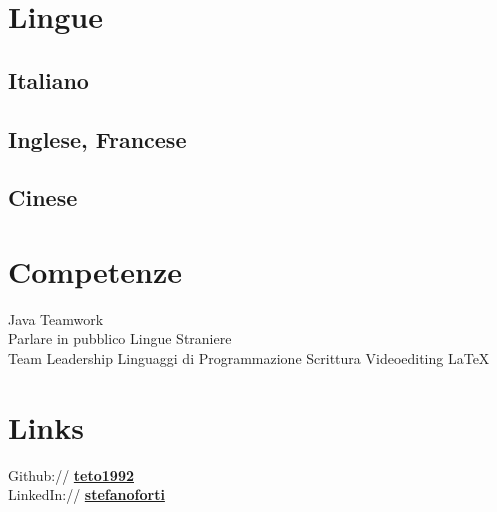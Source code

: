 \documentclass[a4paper]{deedy-resume} %
\begin{document}
\begin{minipage}[t]{0.33\textwidth}

\sectionspace %


\section{Lingue}

\subsection{Italiano}

\subsection{Inglese, Francese}


\subsection{Cinese}

\sectionspace %


\section{Competenze}

Java \textbullet{} Teamwork \textbullet{} \\Parlare in pubblico \textbullet{} Lingue Straniere\textbullet{}\\
Team Leadership\textbullet{} Linguaggi di Programmazione \textbullet{} Scrittura \textbullet{} Videoediting \textbullet{} \LaTeX\ \\ 

\sectionspace %


\section{Links} 

Github:// \href{https://github.com/teto1992/}{\bf teto1992} \\
LinkedIn:// \href{https://it.linkedin.com/pub/stefano-forti/89/5a6/348}{\bf stefanoforti} \\

\sectionspace %


\end{minipage} %
\end{document}
